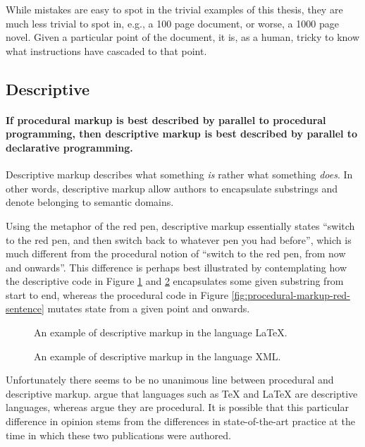 \documentclass{scrreprt}
\begin{document}
While mistakes are easy to spot in the trivial examples of this thesis, they are much less trivial to spot in, e.g., a 100 page document, or worse, a 1000 page novel. Given a particular point of the document, it is, as a human, tricky to know what instructions have cascaded to that point.




\subsection{Descriptive}
\paragraph{If procedural markup is best described by parallel to procedural programming, then descriptive markup is best described by parallel to declarative programming.} Descriptive markup describes what something \emph{is} rather what something \emph{does}. In other words, descriptive markup allow authors to encapsulate substrings and denote belonging to semantic domains.


Using the metaphor of the red pen, descriptive markup essentially states ``switch to the red pen, and then switch back to whatever pen you had before'', which is much different from the procedural notion of ``switch to the red pen, from now and onwards''. This difference is perhaps best illustrated by contemplating how the descriptive code in Figure \ref{fig:descriptive-markup-red-sentence-latex} and \ref{fig:descriptive-markup-red-sentence-xml} encapsulates some given substring from start to end, whereas the procedural code in Figure \ref{fig:procedural-markup-red-sentence} mutates state from a given point and onwards.

\begin{figure}[h]
\centering
{}
\caption{An example of descriptive markup in the language \LaTeX{}.}
\label{fig:descriptive-markup-red-sentence-latex}
\end{figure}



\begin{figure}[h]
\centering
{}
\caption{An example of descriptive markup in the language XML.}
\label{fig:descriptive-markup-red-sentence-xml}
\end{figure}

Unfortunately there seems to be no unanimous line between procedural and descriptive markup. \citet{coombs} argue that languages such as \TeX{} and \LaTeX{} are descriptive languages, whereas \citet{bray} argue they are procedural. It is possible that this particular difference in opinion stems from the differences in state-of-the-art practice at the time in which these two publications were authored.
\end{document}
